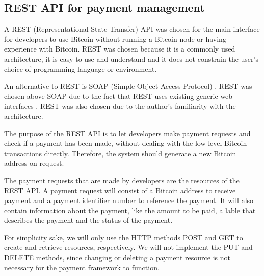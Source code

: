 \subsection{REST API for payment management}

A REST (Representational State Transfer) API \cite{Oracle.com} was chosen for the main interface for developers to use Bitcoin without running a Bitcoin node or having experience with Bitcoin. REST was chosen because it is a commonly used architecture, it is easy to use and understand and it does not constrain the user's choice of programming language or environment. 

An alternative to REST is SOAP (Simple Object Access Protocol) \cite{Box2000}. REST was chosen above SOAP due to the fact that REST uses existing generic web interfaces \cite{Fielding2000}. REST was also chosen due to the author's familiarity with the architecture.

The purpose of the REST API is to let developers make payment requests and check if a payment has been made, without dealing with the low-level Bitcoin transactions directly. Therefore, the system should generate a new Bitcoin address on request. 

The payment requests that are made by developers are the resources of the REST API. A payment request will consist of a Bitcoin address to receive payment and a payment identifier number to reference the payment. It will also contain information about the payment, like the amount to be paid, a lable that describes the payment and the status of the payment.

For simplicity sake, we will only use the HTTP methods POST and GET to create and retrieve resources, respectively. We will not implement the PUT and DELETE methods, since changing or deleting a payment resource is not necessary for the payment framework to function.



